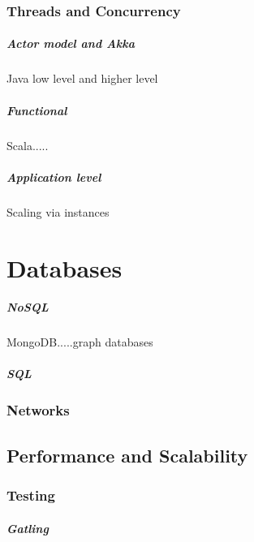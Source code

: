 \documentclass[a4paper, 11pt]{book}
\begin{document}
    \subsection{Threads and Concurrency}

    \paragraph{Actor model and Akka}
    Java low level and higher level

    \paragraph{Functional}
    Scala.....

    \paragraph{Application level}
    Scaling via instances


    \chapter{Databases}

    \paragraph{NoSQL}
    MongoDB.....graph databases

    \paragraph{SQL}

    \subsection{Networks}


    \section{Performance and Scalability}

    \subsection{Testing}

    \paragraph{Gatling}
\end{document}
